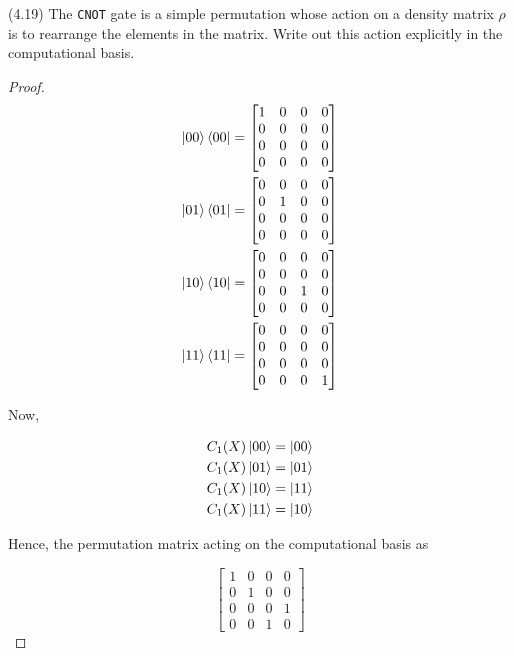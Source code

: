 \documentclass[main.tex]{subfiles}
\begin{document}
\begin{subappendices}
\begin{exercise} (4.19) The \texttt{CNOT} gate is a simple permutation whose action on a density matrix $\rho$ is to rearrange the elements in the matrix. Write out this action explicitly in the computational basis.

\begin{proof}
	\begin{align*}
	\ket{00}\bra{00}  &= \begin{bmatrix}
 1 & 0 & 0 & 0 \\ 0 & 0 & 0 & 0 \\ 	0 & 0 & 0 & 0 \\ 0 & 0 & 0 & 0 
 \end{bmatrix} \\
 \ket{01}\bra{01}  &= \begin{bmatrix}
 0 & 0 & 0 & 0 \\  0 & 1 & 0 & 0 \\0 & 0 & 0 & 0 \\ 0 & 0 & 0 & 0 
 \end{bmatrix}\\
\ket{10}\bra{10}  &= \begin{bmatrix}
 0 & 0 & 0 & 0 \\  0 & 0 & 0 & 0 \\0 & 0 & 1 & 0 \\ 0 & 0 & 0 & 0  	
 \end{bmatrix} \\
 \ket{11}\bra{11}  &= \begin{bmatrix}
 0 & 0 & 0 & 0 \\  0 & 0 & 0 & 0 \\0 & 0 & 0 & 0 \\ 0 & 0 & 0 & 1
 \end{bmatrix}
	\end{align*}

Now, 

\begin{align*}
C_1(X)\ket{00} = \ket{00} \\
C_1(X)\ket{01} = \ket{01} \\
C_1(X)\ket{10} = \ket{11} \\
C_1(X)\ket{11} = \ket{10}
\end{align*}

Hence, the permutation matrix acting on the computational basis as

$$
\begin{bmatrix}
1 & 0 & 0 & 0 \\
0 & 1 & 0 & 0 \\
0 & 0 & 0 & 1 \\
0 & 0 & 1 & 0	
\end{bmatrix}
$$


\end{proof}
\end{exercise}
\end{subappendices}
\end{document}
